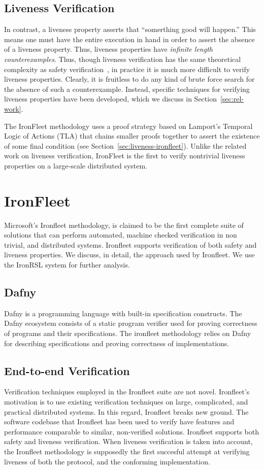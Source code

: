 \documentclass{llncs}
\begin{document}
\subsection{Liveness Verification}
In contrast, a liveness property asserts that ``somerthing good will happen.''
This means one must have the entire execution in hand in order to assert the
absence of a liveness property. Thus, liveness properties have \textit{infinite
  length counterexamples}.  Thus, though liveness verification has the same
theoretical complexity as safety verification~\cite{simulation-liveness}, in
practice it is much more difficult to verify liveness properties. Clearly, it is
fruitless to do any kind of brute force search for the absence of such a
counterexample. Instead, specific techniques for verifying liveness properties
have been developed, which we discuss in Section~\ref{sec:rel-work}.

The IronFleet methodology uses a proof strategy based on Lamport's Temporal
Logic of Actions (TLA) that chains smaller proofs together to assert the
existence of some final condition (see
Section~\ref{sec:liveness-ironfleet}). Unlike the related work on liveness
verification, IronFleet is the first to verify nontrivial liveness properties on
a large-scale distributed system.
%
\section{IronFleet}
Microsoft's Ironfleet methodology, is claimed to be the first complete suite of 
solutions that can perform automated, machine checked verification 
in non trivial, and distributed systems. Ironfleet supports 
verification of both safety and liveness properties. We discuss, in detail, the 
approach used by Ironfleet. We use the IronRSL system for further analysis.

\subsection{Dafny}
Dafny is a programming language with built-in specification constructs. The Dafny
ecosystem consists of a static program verifier used for proving correctness of
programs and their specifications. The ironfleet methodology relies 
on Dafny for describing specifications and proving correctness of implementations. 

\subsection{End-to-end Verification}
Verification techniques employed in the Ironfleet suite are not novel. Ironfleet's 
motivation is to use existing verification techniques on large, complicated, and practical distributed
systems. In this regard, Ironfleet breaks new ground. The software codebase that Ironfleet
has been used to verify have features and performance comparable to similar, non-verified solutions. 
Ironfleet supports both safety and liveness verification. When liveness verification is taken into account, 
the Ironfleet methodology is supposedly the first succesful attempt at verifying liveness of both
the protocol, and the conforming implementation. 
\end{document}
